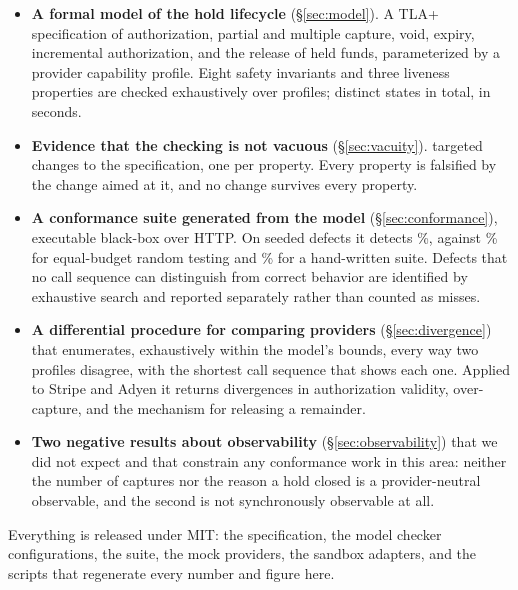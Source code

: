 \documentclass[conference]{IEEEtran}
\begin{document}
\begin{itemize}
\item \textbf{A formal model of the hold lifecycle} (\S\ref{sec:model}). A TLA+
  specification of authorization, partial and multiple capture, void, expiry,
  incremental authorization, and the release of held funds, parameterized by a
  provider capability profile. Eight safety invariants and three liveness
  properties are checked exhaustively over \numprofiles{} profiles;
  \totaldistinctstates{} distinct states in total, in \checkseconds{} seconds.

\item \textbf{Evidence that the checking is not vacuous} (\S\ref{sec:vacuity}).
  \numspecmutations{} targeted changes to the specification, one per property.
  Every property is falsified by the change aimed at it, and no change survives
  every property.

\item \textbf{A conformance suite generated from the model}
  (\S\ref{sec:conformance}), executable black-box over HTTP. On
  \killablemutants{} seeded defects it detects \modelrate{}\%, against
  \randomrate{}\% for equal-budget random testing and \handrate{}\% for a
  hand-written suite. Defects that no call sequence can distinguish from correct
  behavior are identified by exhaustive search and reported separately rather
  than counted as misses.

\item \textbf{A differential procedure for comparing providers}
  (\S\ref{sec:divergence}) that enumerates, exhaustively within the model's
  bounds, every way two profiles disagree, with the shortest call sequence that
  shows each one. Applied to Stripe and Adyen it returns divergences in
  authorization validity, over-capture, and the mechanism for releasing a
  remainder.

\item \textbf{Two negative results about observability}
  (\S\ref{sec:observability}) that we did not expect and that constrain any
  conformance work in this area: neither the number of captures nor the reason a
  hold closed is a provider-neutral observable, and the second is not
  synchronously observable at all.
\end{itemize}

Everything is released under MIT: the specification, the model checker
configurations, the suite, the mock providers, the sandbox adapters, and the
scripts that regenerate every number and figure here.
\end{document}
